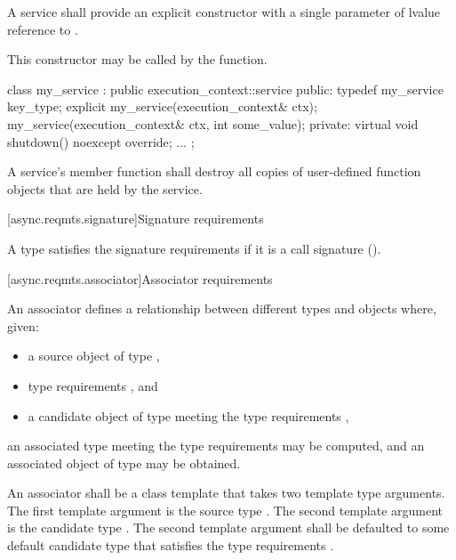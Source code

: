 \pnum
A service shall provide an explicit constructor with a single parameter of lvalue reference to . \begin{note} This constructor may be called by the  function. \end{note}

\pnum
\begin{example} 

\begin{codeblock}
class my_service : public execution_context::service
{
public:
  typedef my_service key_type;
  explicit my_service(execution_context& ctx);
  my_service(execution_context& ctx, int some_value);
private:
  virtual void shutdown() noexcept override;
  ...
};
\end{codeblock}

\end{example}

\pnum
A service's  member function shall destroy all copies of user-defined function objects that are held by the service.



[async.reqmts.signature]{Signature requirements}

\pnum
 A type satisfies the signature requirements if it is a call signature ().



[async.reqmts.associator]{Associator requirements}

\pnum
An associator defines a relationship between different types and objects where, given:

\begin{itemize}
\item
a source object  of type ,

\item
type requirements , and

\item
a candidate object  of type  meeting the type requirements ,
\end{itemize}

an associated type  meeting the type requirements  may be computed, and an associated object  of type  may be obtained.

\pnum
An associator shall be a class template that takes two template type arguments. The first template argument is the source type . The second template argument is the candidate type . The second template argument shall be defaulted to some default candidate type  that satisfies the type requirements .

